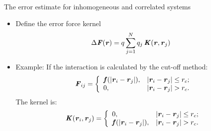 \documentclass{beamer}
\newcommand{\bluec}[1]{{\color{blue} #1}}
\newcommand{\vect}[1]{\textbf{\textit{#1}}}
\begin{document}
\begin{frame}{The error estimate for inhomogeneous and correlated systems}
  \begin{itemize}
  \item <1-> Define the error force kernel
    \bluec{
      \begin{align*}
        \Delta \vect F(\vect r)
        &=
        q \sum_{j=1}^N q_j \,\vect K(\vect r, \vect r_j)
      \end{align*}}
  \item <2->
    Example: If the interaction is calculated by the cut-off method:
    \bluec{
      \begin{align*}
        \vect F_{ij} =
        \left\{
          \begin{array}{ll}
            \vect f(\vert\vect r_i-\vect r_j\vert), & \vert\vect r_i - \vect r_j\vert\leq r_c; \\
            0, & \vert\vect r_i - \vect r_j\vert > r_c.
          \end{array}
        \right.      
    \end{align*}
    }
    The kernel is:
    \bluec{
      \begin{align*}
        \vect K(\vect r_i,\vect r_j) =
        \left\{
          \begin{array}{ll}
            0, & \vert\vect r_i - \vect r_j\vert\leq r_c; \\
            \vect f(\vert\vect r_i-\vect r_j\vert), & \vert\vect r_i - \vect r_j\vert > r_c.
          \end{array}
        \right.
      \end{align*}}
    \vfill
  \end{itemize}
\end{frame}
\end{document}
